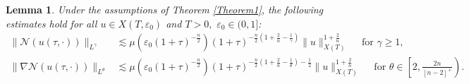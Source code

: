 \documentclass[11pt,reqno]{amsart}
\newtheorem{lemma}{Lemma}[section]
\begin{document}
\begin{lemma}\label{lemma1.3}
    Under the assumptions of Theorem \ref{Theorem1}, the following estimates hold for all $u \in X(T,\varepsilon_0)$ and $T >0, \,\, \varepsilon_0 \in (0, 1]$:
    \begin{align*}
    \|\mathcal{N}(u(\tau,\cdot))\|_{L^{\gamma}} &\lesssim \mu\left(\varepsilon_0 (1+\tau)^{-\frac{n}{2}}\right) (1+\tau)^{-\frac{n}{2}(1+\frac{2}{n}-\frac{1}{\gamma})}  \|u\|_{X(T)}^{1+\frac{2}{n}} \quad\text{ for } \gamma \geq 1,\\
    \|\nabla \mathcal{N}(u(\tau,\cdot))\|_{L^{\theta}} &\lesssim \mu\left(\varepsilon_0 (1+\tau)^{-\frac{n}{2}}\right) (1+\tau)^{-\frac{n}{2}(1+\frac{2}{n}-\frac{1}{\theta})-\frac{1}{2}}  \|u\|_{X(T)}^{1+\frac{2}{n}} \quad \text{ for } \theta \in \left[2, \frac{2n}{[n-2]^+}\right).
    \end{align*}
\end{lemma}
\end{document}
